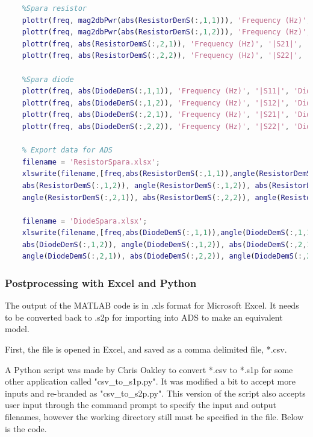 \documentclass{article} %
\begin{document}
\begin{lstlisting}[language=Matlab, caption=De-embedding MATLAB Code]
	%plottr(freq, abs(Test(:,2,1)), 'Frequency (Hz)', '|S21|', 'Resistor S21(test)')
	%Spara resistor
	plottr(freq, mag2dbPwr(abs(ResistorDemS(:,1,1))), 'Frequency (Hz)', '|S11|', 'Resistor S11')
	plottr(freq, mag2dbPwr(abs(ResistorDemS(:,1,2))), 'Frequency (Hz)', '|S12|', 'Resistor S12')
	plottr(freq, abs(ResistorDemS(:,2,1)), 'Frequency (Hz)', '|S21|', 'Resistor S21')
	plottr(freq, abs(ResistorDemS(:,2,2)), 'Frequency (Hz)', '|S22|', 'Resistor S22')
	
	%Spara diode
	plottr(freq, abs(DiodeDemS(:,1,1)), 'Frequency (Hz)', '|S11|', 'Diode S11')
	plottr(freq, abs(DiodeDemS(:,1,2)), 'Frequency (Hz)', '|S12|', 'Diode S12')
	plottr(freq, abs(DiodeDemS(:,2,1)), 'Frequency (Hz)', '|S21|', 'Diode S21')
	plottr(freq, abs(DiodeDemS(:,2,2)), 'Frequency (Hz)', '|S22|', 'Diode S22')
	
	% Export data for ADS
	filename = 'ResistorSpara.xlsx';
	xlswrite(filename,[freq,abs(ResistorDemS(:,1,1)),angle(ResistorDemS(:,1,1)), ...
	abs(ResistorDemS(:,1,2)), angle(ResistorDemS(:,1,2)), abs(ResistorDemS(:,2,1)), ...
	angle(ResistorDemS(:,2,1)), abs(ResistorDemS(:,2,2)), angle(ResistorDemS(:,2,2))]);
	
	filename = 'DiodeSpara.xlsx';
	xlswrite(filename,[freq,abs(DiodeDemS(:,1,1)),angle(DiodeDemS(:,1,1)), ...
	abs(DiodeDemS(:,1,2)), angle(DiodeDemS(:,1,2)), abs(DiodeDemS(:,2,1)), ...
	angle(DiodeDemS(:,2,1)), abs(DiodeDemS(:,2,2)), angle(DiodeDemS(:,2,2))]);
	\end{lstlisting}
	
	\subsubsection{Postprocessing with Excel and Python}
	The output of the MATLAB code is in .xls format for Microsoft Excel.  It needs to be converted back to .s2p for importing into ADS to make an equivalent model.
	
	First, the file is opened in Excel, and saved as a comma delimited file, *.csv.
	
	A Python script was made by Chris Oakley to convert *.csv to *.s1p for some other application called "csv\_to\_s1p.py".  It was modified a bit to accept more inputs and re-branded as "csv\_to\_s2p.py". This version of the script also accepts user input through the command prompt to specify the input and output filenames, however the working directory still must be specified in the file.  Below is the code.
	
\end{document}
